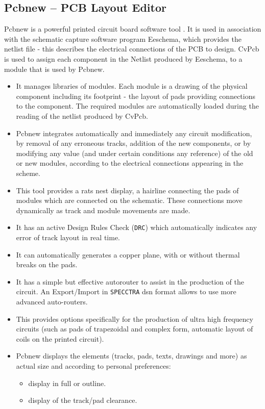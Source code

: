 \subsection {Pcbnew -- PCB Layout Editor}
Pcbnew is a powerful printed circuit board software tool \cite{eeschema}. It is used in association with the schematic capture software program Eeschema, which provides the netlist file - this describes the electrical connections of the PCB to design. CvPcb is used to assign each component in the Netlist produced by Eeschema, to a module that is used by Pcbnew.
\begin{itemize}
\item It manages libraries of modules. Each module is a drawing of the physical component including its footprint - the layout of pads providing connections to the component. The required modules are automatically loaded during the reading of the netlist produced by CvPcb.
\item Pcbnew integrates automatically and immediately any circuit modification, by removal of any erroneous tracks, addition of the new components, or by modifying any value (and under certain conditions any reference) of the old or new modules, according to the electrical connections appearing in the scheme.  
\item This tool provides a rats nest display, a hairline connecting the pads of modules which are connected on the schematic. These connections move dynamically as track and module movements are made.
\item It has an active Design Rules Check ({\tt DRC}) which automatically indicates any error of track layout in real time.
\item It can automatically generates a copper plane, with or without thermal breaks on the pads. 
\item It has a simple but effective autorouter to assist in the production of the circuit. An Export/Import in {\tt SPECCTRA}  dsn format allows to use more advanced auto-routers. 
\item This provides options specifically for the production of ultra high frequency circuits (such as pads of trapezoidal and complex form, automatic layout of coils on the printed circuit). 
\item Pcbnew displays the elements (tracks, pads, texts, drawings and more) as actual size and according to personal preferences:
\begin{itemize}
\item display in full or outline.
\item display of the track/pad clearance.
\end{itemize}
\end{itemize}


